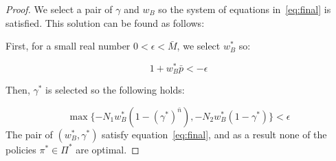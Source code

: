 \begin{proof}
We select a pair of $\gamma$ and $w_B$ so the system of equations in~\eqref{eq:final} is satisfied. This solution can be found as follows:

First, for a small real number $0<\epsilon < \bar{M}$, we select $w_B^*$ so:

\begin{equation}
1 + w_B^* \bar{p} < -\epsilon
\end{equation}

Then, $\gamma^*$ is selected so the following holds:

\begin{equation}
\max \{ -N_1 w_B^* (1 - (\gamma^*)^{\bar{n}}) , -N_2 w_B^* (1 -\gamma^*) \} < \epsilon 
\end{equation}
The pair of $(w_B^*, \gamma^*)$ satisfy equation~\eqref{eq:final}, and as a result none of the policies $\pi^* \in \Pi^*$ are optimal.
\end{proof}
















